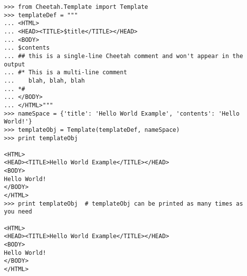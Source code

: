 \begin{verbatim}
>>> from Cheetah.Template import Template
>>> templateDef = """
... <HTML>
... <HEAD><TITLE>$title</TITLE></HEAD>
... <BODY>
... $contents
... ## this is a single-line Cheetah comment and won't appear in the output
... #* This is a multi-line comment
...    blah, blah, blah 
... *#
... </BODY>
... </HTML>"""
>>> nameSpace = {'title': 'Hello World Example', 'contents': 'Hello World!'}
>>> templateObj = Template(templateDef, nameSpace)
>>> print templateObj
 
<HTML>
<HEAD><TITLE>Hello World Example</TITLE></HEAD>
<BODY>
Hello World!
</BODY>
</HTML>
>>> print templateObj  # templateObj can be printed as many times as you need
 
<HTML>
<HEAD><TITLE>Hello World Example</TITLE></HEAD>
<BODY>
Hello World!
</BODY>
</HTML>

\end{verbatim}


